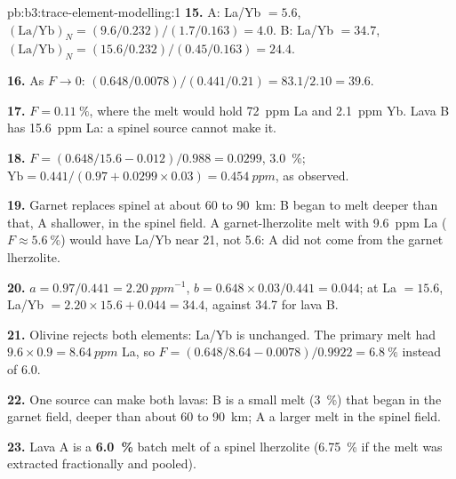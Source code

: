 \begin{solution}{pb:b3:trace-element-modelling:1}
\textbf{15.} A: La/Yb $= 5.6$, $(\mathrm{La}/\mathrm{Yb})_N =
(9.6/0.232)/(1.7/0.163) = 4.0$. B: La/Yb $= 34.7$, $(\mathrm{La}/\mathrm{Yb})_N
= (15.6/0.232)/(0.45/0.163) = 24.4$.

\textbf{16.} As $F \to 0$: $(0.648/0.0078)/(0.441/0.21) = 83.1/2.10 = 39.6$.

\textbf{17.} $F = \qty{0.11}{\percent}$, where the melt would hold
\qty{72}{ppm} La and \qty{2.1}{ppm} Yb. Lava B has \qty{15.6}{ppm} La: a
spinel source cannot make it.

\textbf{18.} $F = (0.648/15.6 - 0.012)/0.988 = 0.0299$, \qty{3.0}{\percent};
$\mathrm{Yb} = 0.441/(0.97 + 0.0299\times0.03) = \qty{0.454}{ppm}$, as
observed.

\textbf{19.} Garnet replaces spinel at about 60 to \qty{90}{km}: B began to
melt deeper than that, A shallower, in the spinel field. A garnet-lherzolite
melt with \qty{9.6}{ppm} La ($F \approx \qty{5.6}{\percent}$) would have La/Yb
near 21, not 5.6: A did not come from the garnet lherzolite.

\textbf{20.} $a = 0.97/0.441 = \qty{2.20}{ppm^{-1}}$, $b = 0.648\times0.03/0.441
= 0.044$; at La $= 15.6$, La/Yb $= 2.20\times15.6 + 0.044 = 34.4$, against
34.7 for lava B.

\textbf{21.} Olivine rejects both elements: La/Yb is unchanged. The primary
melt had $9.6\times0.9 = \qty{8.64}{ppm}$ La, so $F = (0.648/8.64 -
0.0078)/0.9922 = \qty{6.8}{\percent}$ instead of 6.0.

\textbf{22.} One source can make both lavas: B is a small melt
(\qty{3}{\percent}) that began in the garnet field, deeper than about 60 to
\qty{90}{km}; A a larger melt in the spinel field.

\textbf{23.} Lava A is a \textbf{\qty[text-series-to-math=true]{6.0}{\percent}}
batch melt of a spinel lherzolite (\qty{6.75}{\percent} if the melt was
extracted fractionally and pooled).
\end{solution}
